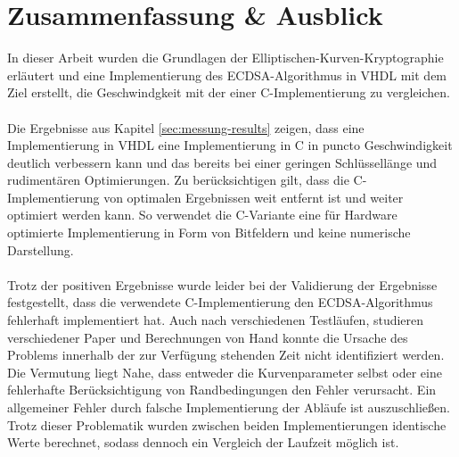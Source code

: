 \chapter{Zusammenfassung \& Ausblick} 
\label{sec:fazit}
In dieser Arbeit wurden die Grundlagen der Elliptischen-Kurven-Kryptographie erläutert und eine Implementierung des ECDSA-Algorithmus in VHDL mit dem Ziel erstellt, die Geschwindgkeit mit der einer C-Implementierung zu vergleichen.
\\ \\
Die Ergebnisse aus Kapitel \ref{sec:messung-results} zeigen, dass eine Implementierung in VHDL eine Implementierung in C in puncto Geschwindigkeit deutlich verbessern kann und das bereits bei einer geringen Schlüssellänge und rudimentären Optimierungen. Zu berücksichtigen gilt, dass die C-Implementierung von optimalen Ergebnissen weit entfernt ist und weiter optimiert werden kann. So verwendet die C-Variante eine für Hardware optimierte Implementierung in Form von Bitfeldern und keine numerische Darstellung.
\\ \\
Trotz der positiven Ergebnisse wurde leider bei der Validierung der Ergebnisse festgestellt, dass die verwendete C-Implementierung den ECDSA-Algorithmus fehlerhaft implementiert hat. Auch nach verschiedenen Testläufen, studieren verschiedener Paper und Berechnungen von Hand konnte die Ursache des Problems innerhalb der zur Verfügung stehenden Zeit nicht identifiziert werden. Die Vermutung liegt Nahe, dass entweder die Kurvenparameter selbst oder eine fehlerhafte Berücksichtigung von Randbedingungen den Fehler verursacht. Ein allgemeiner Fehler durch falsche Implementierung der Abläufe ist auszuschließen. Trotz dieser Problematik wurden zwischen beiden Implementierungen identische Werte berechnet, sodass dennoch ein Vergleich der Laufzeit möglich ist.


